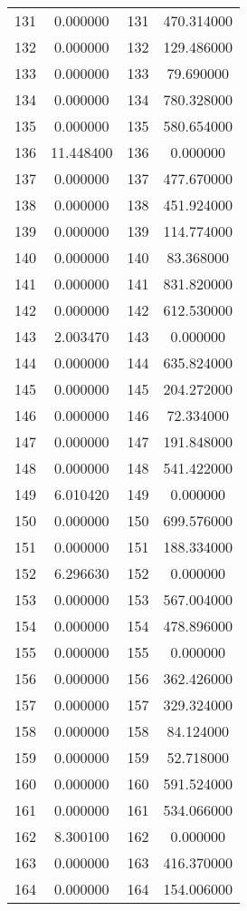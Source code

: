 \documentclass[12pt]{article}
\begin{document}
\begin{longtable}{@{}cccc@{}}
131 & 0.000000 & 131 & 470.314000 \\
132 & 0.000000 & 132 & 129.486000 \\
133 & 0.000000 & 133 & 79.690000 \\
134 & 0.000000 & 134 & 780.328000 \\
135 & 0.000000 & 135 & 580.654000 \\
136 & 11.448400 & 136 & 0.000000 \\
137 & 0.000000 & 137 & 477.670000 \\
138 & 0.000000 & 138 & 451.924000 \\
139 & 0.000000 & 139 & 114.774000 \\
140 & 0.000000 & 140 & 83.368000 \\
141 & 0.000000 & 141 & 831.820000 \\
142 & 0.000000 & 142 & 612.530000 \\
143 & 2.003470 & 143 & 0.000000 \\
144 & 0.000000 & 144 & 635.824000 \\
145 & 0.000000 & 145 & 204.272000 \\
146 & 0.000000 & 146 & 72.334000 \\
147 & 0.000000 & 147 & 191.848000 \\
148 & 0.000000 & 148 & 541.422000 \\
149 & 6.010420 & 149 & 0.000000 \\
150 & 0.000000 & 150 & 699.576000 \\
151 & 0.000000 & 151 & 188.334000 \\
152 & 6.296630 & 152 & 0.000000 \\
153 & 0.000000 & 153 & 567.004000 \\
154 & 0.000000 & 154 & 478.896000 \\
155 & 0.000000 & 155 & 0.000000 \\
156 & 0.000000 & 156 & 362.426000 \\
157 & 0.000000 & 157 & 329.324000 \\
158 & 0.000000 & 158 & 84.124000 \\
159 & 0.000000 & 159 & 52.718000 \\
160 & 0.000000 & 160 & 591.524000 \\
161 & 0.000000 & 161 & 534.066000 \\
162 & 8.300100 & 162 & 0.000000 \\
163 & 0.000000 & 163 & 416.370000 \\
164 & 0.000000 & 164 & 154.006000 \\

\end{longtable}
\end{document}
